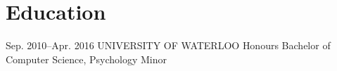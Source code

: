 \documentclass{friggeri-cv}
\begin{document}
\vspace{-2.5\parskip}
\section{Education}

\begin{sectionlist}
		
	\education
	{Sep. 2010--Apr. 2016}
	{UNIVERSITY OF WATERLOO}
	{Honours Bachelor of Computer Science, Psychology Minor}
	
\end{sectionlist}
\end{document}
